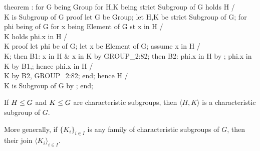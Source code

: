 \nwenddocs{}\endmoddef\nwstartdeflinemarkup{}\nwenddeflinemarkup
theorem :
  for G being Group
  for H,K being strict  Subgroup of G
  holds H /\\ K is  Subgroup of G
proof
  let G be Group;
  let H,K be strict  Subgroup of G;
  for phi being  of G
  for x being Element of G st x in H /\\ K
  holds phi.x in H /\\ K
  proof
    let phi be  of G;
    let x be Element of G;
    assume x in H /\\ K;
    then B1: x in H & x in K by GROUP_2:82;
    then B2: phi.x in H by ;
    phi.x in K by B1,;
    hence phi.x in H /\\ K by B2, GROUP_2:82;
  end;
  hence H /\\ K is  Subgroup of G by ;
end;
\eatline
{}\nwendcode{}\nwdocspar
\begin{theorem}
  If $H\leq G$ and $K\leq G$ are characteristic subgroups,
  then $\langle H, K\rangle$ is a characteristic subgroup of $G$.
\end{theorem}

\begin{thm-remark}
More generally, if $\{K_{i}\}_{i\in I}$ is any family of characteristic subgroups
of $G$, then their join $\langle K_{i}\rangle_{i\in I}$.
\end{thm-remark}

